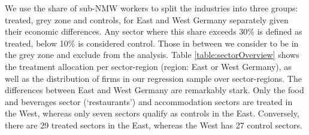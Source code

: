We use the share of sub-NMW workers to split the industries into three groups: treated, grey zone and controls, for East and West Germany separately given their economic differences. Any sector where this share exceeds 30\% is defined as treated, below 10\% is considered control. Those in between we consider to be in the grey zone and exclude from the analysis. Table \ref{table:sectorOverview} shows the treatment allocation per sector-region (region: East or West Germany), as well as the distribution of firms in our regression sample over sector-regions. The differences between East and West Germany are remarkably stark. Only the food and beverages sector (`restaurants') and accommodation sectors are treated in the West, whereas only seven sectors qualify as controls in the East. Conversely, there are 29 treated sectors in the East, whereas the West has 27 control sectors. 


